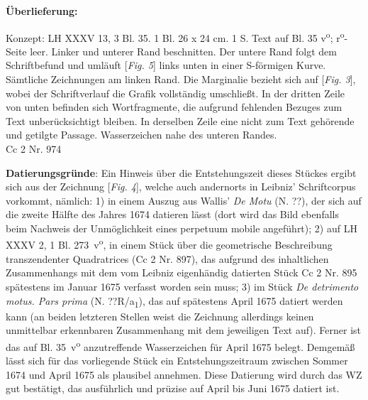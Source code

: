 \begin{ledgroupsized}[r]{120mm}
\footnotesize 
\pstart 
\noindent\textbf{\"{U}berlieferung:}
\pend
\end{ledgroupsized}
\begin{ledgroupsized}[r]{114mm}
\footnotesize 
\pstart \parindent -6mm
 Konzept: LH XXXV 13, 3 Bl. 35. 1 Bl. 26 x 24 cm. 1 S. Text auf Bl. 35 v\textsuperscript{o}; r\textsuperscript{o}-Seite leer. Linker und unterer Rand beschnitten. Der untere Rand folgt dem Schriftbefund und uml\"{a}uft [\textit{Fig. 5}] links unten in einer S-f\"{o}rmigen Kurve. S\"{a}mtliche Zeichnungen am linken Rand. Die Marginalie bezieht sich auf [\textit{Fig. 3}], wobei der Schriftverlauf die Grafik vollst\"{a}ndig umschlie{\ss}t. In der dritten Zeile von unten befinden sich Wortfragmente, die aufgrund fehlenden Bezuges zum Text unber\"{u}cksichtigt bleiben. In derselben Zeile eine nicht zum Text geh\"{o}rende und getilgte Passage. Wasserzeichen nahe des unteren Randes. \\Cc 2 Nr. 974 \pend
\end{ledgroupsized}
 
\vspace*{5mm}
\begin{ledgroup}
\footnotesize 
\pstart
\noindent\footnotesize{\textbf{Datierungsgr\"{u}nde}: Ein Hinweis \"{u}ber die Entstehungszeit dieses St\"{u}ckes ergibt sich aus der Zeichnung [\textit{Fig. 4}], welche auch andernorts in Leibniz' Schriftcorpus vorkommt, n\"{a}mlich: 1) in einem Auszug aus Wallis' \textit{De Motu} (N. ??), der sich auf die zweite H\"{a}lfte des Jahres 1674 datieren l\"{a}sst (dort wird das Bild ebenfalls beim Nachweis der Unm\"{o}glichkeit eines perpetuum mobile angef\"{u}hrt); 2) auf LH XXXV 2, 1 Bl. 273~v\textsuperscript{o}, in einem St\"{u}ck \"{u}ber die geometrische Beschreibung transzendenter Quadratrices (Cc 2 Nr. 897), das aufgrund des inhaltlichen Zusammenhangs mit dem vom Leibniz eigenh\"{a}ndig datierten St\"{u}ck Cc 2 Nr. 895 sp\"{a}testens im Januar 1675 verfasst worden sein muss; 3) im St\"{u}ck \textit{De detrimento motus. Pars prima} (N. ??R/a\textsubscript{1}), das auf sp\"{a}testens April 1675 datiert werden kann (an beiden letzteren Stellen weist die Zeichnung allerdings keinen unmittelbar erkennbaren Zusammenhang mit dem jeweiligen Text auf). Ferner ist das auf Bl. 35~v\textsuperscript{o} anzutreffende Wasserzeichen f\"{u}r April 1675 belegt. Demgem\"{a}{\ss} l\"{a}sst sich f\"{u}r das vorliegende St\"{u}ck ein Entstehungszeitraum zwischen Sommer 1674 und April 1675 als plausibel annehmen. Diese Datierung wird durch das WZ gut best\"{a}tigt, das ausf\"{u}hrlich und pr\"{u}zise auf April bis Juni 1675 datiert ist.}
\pend
\end{ledgroup}

